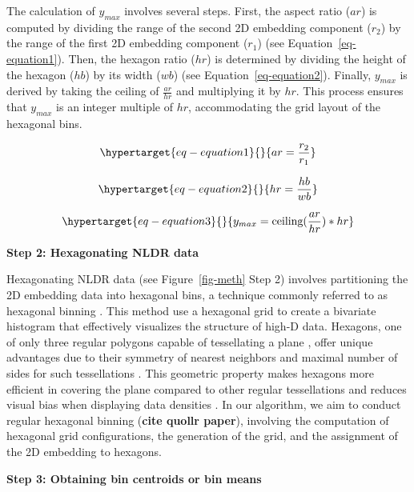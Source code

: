 \documentclass[
  12pt]{article}
\begin{document}
The calculation of \(y_{max}\) involves several steps. First, the aspect
ratio (\(ar\)) is computed by dividing the range of the second 2D
embedding component (\(r_2\)) by the range of the first 2D embedding
component (\(r_1\)) (see Equation~\ref{eq-equation1}). Then, the hexagon
ratio (\(hr\)) is determined by dividing the height of the hexagon
(\(hb\)) by its width (\(wb\)) (see Equation~\ref{eq-equation2}).
Finally, \(y_{max}\) is derived by taking the ceiling of
\(\frac{ar}{hr}\) and multiplying it by \(hr\). This process ensures
that \(y_{max}\) is an integer multiple of \(hr\), accommodating the
grid layout of the hexagonal bins.

\begin{equation}\protect\hypertarget{eq-equation1}{}{
 ar = \frac{r_2}{r_1}
}\label{eq-equation1}\end{equation}

\begin{equation}\protect\hypertarget{eq-equation2}{}{
 hr = \frac{hb}{wb}
}\label{eq-equation2}\end{equation}

\begin{equation}\protect\hypertarget{eq-equation3}{}{
 y_{max} = \text{ceiling}(\frac{ar}{hr}) * hr
}\label{eq-equation3}\end{equation}

\textbf{Step 2: Hexagonating NLDR data}

Hexagonating NLDR data (see Figure~\ref{fig-meth} Step 2) involves
partitioning the 2D embedding data into hexagonal bins, a technique
commonly referred to as hexagonal binning
\citep[\citet{article66}]{Carr1987}. This method use a hexagonal grid to
create a bivariate histogram that effectively visualizes the structure
of high-D data. Hexagons, one of only three regular polygons capable of
tessellating a plane \citep{Carr2013}, offer unique advantages due to
their symmetry of nearest neighbors and maximal number of sides for such
tessellations \citep{Dan2023}. This geometric property makes hexagons
more efficient in covering the plane compared to other regular
tessellations and reduces visual bias when displaying data densities
\citep{Dan2023}. In our algorithm, we aim to conduct regular hexagonal
binning (\textbf{cite quollr paper}), involving the computation of
hexagonal grid configurations, the generation of the grid, and the
assignment of the 2D embedding to hexagons.

\textbf{Step 3: Obtaining bin centroids or bin means}
\end{document}
